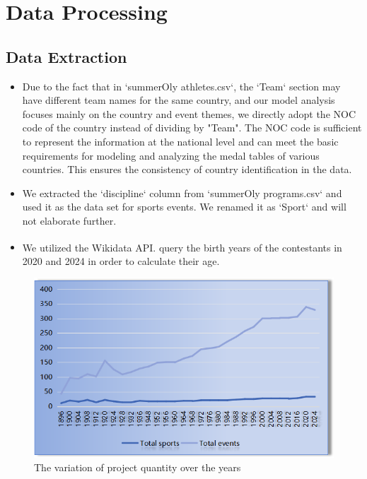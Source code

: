 \documentclass{mcmthesis}  %
\begin{document}
\section{Data Processing}  %

\subsection{Data Extraction}  %
\begin{itemize}  %
\item Due to the fact that in `summerOly athletes.csv`, the `Team` section may have different team names for the same country, and our model analysis focuses mainly on the country and event themes, we directly adopt the NOC code of the country instead of dividing by "Team". The NOC code is sufficient to represent the information at the national level and can meet the basic requirements for modeling and analyzing the medal tables of various countries. This ensures the consistency of country identification in the data.
\item We extracted the `discipline` column from `summerOly programs.csv` and used it as the data set for sports events. We renamed it as `Sport` and will not elaborate further.
\item We utilized the Wikidata API.\textsuperscript{\cite{[1]}}  %
query the birth years of the contestants in 2020 and 2024 in order to calculate their age.
\end{itemize}  %
\begin{figure}[H]  %
\small
\centering  %
\includegraphics[width=12cm]{a.png}  %
\caption{The variation of project quantity over the years}  %
\end{figure}  %
\end{document}
